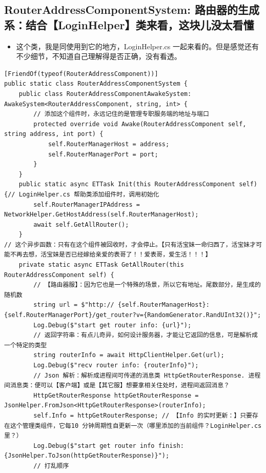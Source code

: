\documentclass[9pt, b5paper]{article}
\begin{document}
\subsection{RouterAddressComponentSystem: 路由器的生成系：结合【LoginHelper】类来看，这块儿没太看懂}
\label{sec-7-10}
\begin{itemize}
\item 这个类，我是同使用到它的地方，LoginHelper.cs 一起来看的。但是感觉还有不少细节，不知道自己理解得是否正确，没有看透。
\end{itemize}
\begin{verbatim}
[FriendOf(typeof(RouterAddressComponent))]
public static class RouterAddressComponentSystem {
    public class RouterAddressComponentAwakeSystem: AwakeSystem<RouterAddressComponent, string, int> {
        // 添加这个组件时，永远记住的是管理专职服务端的地址与端口
        protected override void Awake(RouterAddressComponent self, string address, int port) {
            self.RouterManagerHost = address;
            self.RouterManagerPort = port;
        }
    }
    public static async ETTask Init(this RouterAddressComponent self) {// LoginHelper.cs 帮助类添加组件时，调用初始化
        self.RouterManagerIPAddress = NetworkHelper.GetHostAddress(self.RouterManagerHost);
        await self.GetAllRouter();
    }
// 这个异步函数：只有在这个组件被回收时，才会停止。【只有活宝妹一命归西了，活宝妹才可能不再去想，活宝妹是否已经嫁给亲爱的表哥了！！爱表哥，爱生活！！！】
    private static async ETTask GetAllRouter(this RouterAddressComponent self) { 
        // 【路由器服】：因为它也是一个特殊的场景，所以它有地址。尾数部分，是生成的随机数
        string url = $"http:// {self.RouterManagerHost}:{self.RouterManagerPort}/get_router?v={RandomGenerator.RandUInt32()}";
        Log.Debug($"start get router info: {url}");
        // 返回字符串：有点儿奇异，如何设计服务器，才能让它返回的信息，可是解析成一个特定的类型
        string routerInfo = await HttpClientHelper.Get(url);
        Log.Debug($"recv router info: {routerInfo}");
        // Json 解析：解析成进程间可传递的消息类 HttpGetRouterResponse. 进程间消息类：便可以【客户端】或是【其它服】想要拿相关住处时，进程间返回消息？
        HttpGetRouterResponse httpGetRouterResponse = JsonHelper.FromJson<HttpGetRouterResponse>(routerInfo);
        self.Info = httpGetRouterResponse; // 【Info 的实时更新：】只要存在这个管理类组件，它每10 分钟周期性自更新一次（哪里添加的当前组件？LoginHelper.cs 里？）
        Log.Debug($"start get router info finish: {JsonHelper.ToJson(httpGetRouterResponse)}");
        // 打乱顺序

\end{verbatim}
\end{document}
